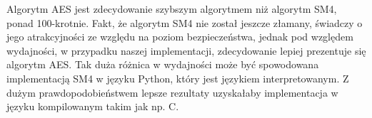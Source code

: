 Algorytm AES jest zdecydowanie szybszym algorytmem niż algorytm SM4, ponad 100-krotnie. Fakt, że algorytm SM4 nie został jeszcze złamany, świadczy o jego atrakcyjności ze względu na poziom bezpieczeństwa, jednak pod względem wydajności, w przypadku naszej implementacji, zdecydowanie lepiej prezentuje się algorytm AES. Tak duża różnica w wydajności może być spowodowana implementacją SM4 w języku Python, który jest językiem interpretowanym. Z dużym prawdopodobieństwem lepsze rezultaty uzyskałaby implementacja w języku kompilowanym takim jak np. C.